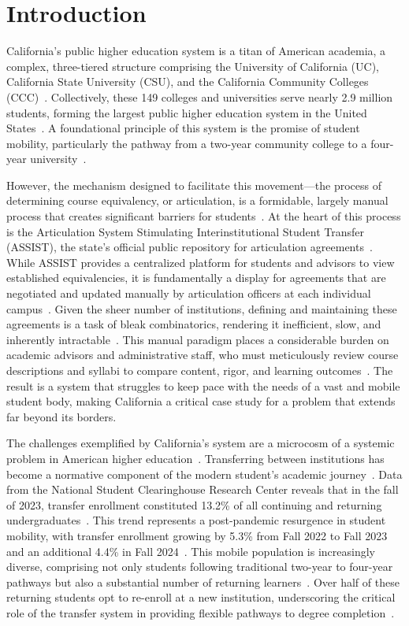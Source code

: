 \chapter{Introduction}

California's public higher education system is a titan of American academia, a complex, three-tiered structure comprising the University of California (UC), California State University (CSU), and the California Community Colleges (CCC)~\cite{ppic}. Collectively, these 149 colleges and universities serve nearly 2.9 million students, forming the largest public higher education system in the United States~\cite{ppic,uc,calstate,cccco}. A foundational principle of this system is the promise of student mobility, particularly the pathway from a two-year community college to a four-year university~\cite{ppic}.

However, the mechanism designed to facilitate this movement—the process of determining course equivalency, or articulation, is a formidable, largely manual process that creates significant barriers for students~\cite{pardos2019}. At the heart of this process is the Articulation System Stimulating Interinstitutional Student Transfer (ASSIST), the state's official public repository for articulation agreements~\cite{assistinfo}. While ASSIST provides a centralized platform for students and advisors to view established equivalencies, it is fundamentally a display for agreements that are negotiated and updated manually by articulation officers at each individual campus~\cite{assistfaq}. Given the sheer number of institutions, defining and maintaining these agreements is a task of bleak combinatorics, rendering it inefficient, slow, and inherently intractable~\cite{pardos2019}. This manual paradigm places a considerable burden on academic advisors and administrative staff, who must meticulously review course descriptions and syllabi to compare content, rigor, and learning outcomes~\cite{pardos2019}. The result is a system that struggles to keep pace with the needs of a vast and mobile student body, making California a critical case study for a problem that extends far beyond its borders.

The challenges exemplified by California's system are a microcosm of a systemic problem in American higher education~\cite{collegeopportunity2017}. Transferring between institutions has become a normative component of the modern student's academic journey~\cite{publicagenda2025}. Data from the National Student Clearinghouse Research Center reveals that in the fall of 2023, transfer enrollment constituted 13.2\% of all continuing and returning undergraduates~\cite{nscnews2023}. This trend represents a post-pandemic resurgence in student mobility, with transfer enrollment growing by 5.3\% from Fall 2022 to Fall 2023 and an additional 4.4\% in Fall 2024~\cite{nscnews2023,nscnews20250305}. This mobile population is increasingly diverse, comprising not only students following traditional two-year to four-year pathways but also a substantial number of returning learners~\cite{nscdd20250507}. Over half of these returning students opt to re-enroll at a new institution, underscoring the critical role of the transfer system in providing flexible pathways to degree completion~\cite{nscdd20250507}.

